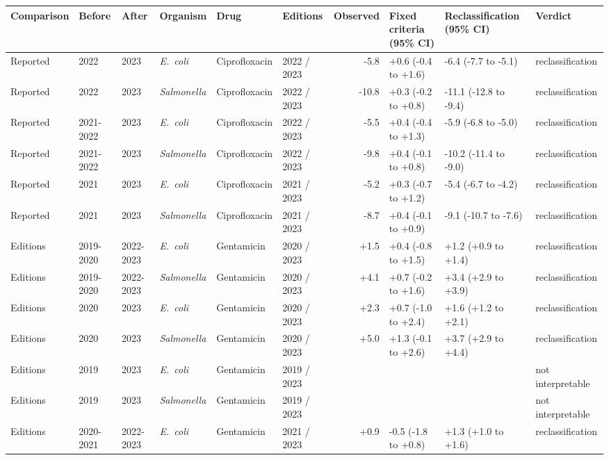 \begin{table}[h]
\centering
\scriptsize
\begin{tabular}{llllllrlll}
\toprule
Comparison & Before & After & Organism & Drug & Editions & Observed & Fixed criteria (95\% CI) & Reclassification (95\% CI) & Verdict \\
\midrule
Reported & 2022 & 2023 & \textit{E.~coli} & Ciprofloxacin & 2022 / 2023 & -5.8 & +0.6 (-0.4 to +1.6) & -6.4 (-7.7 to -5.1) & reclassification \\
Reported & 2022 & 2023 & \textit{Salmonella} & Ciprofloxacin & 2022 / 2023 & -10.8 & +0.3 (-0.2 to +0.8) & -11.1 (-12.8 to -9.4) & reclassification \\
Reported & 2021-2022 & 2023 & \textit{E.~coli} & Ciprofloxacin & 2022 / 2023 & -5.5 & +0.4 (-0.4 to +1.3) & -5.9 (-6.8 to -5.0) & reclassification \\
Reported & 2021-2022 & 2023 & \textit{Salmonella} & Ciprofloxacin & 2022 / 2023 & -9.8 & +0.4 (-0.1 to +0.8) & -10.2 (-11.4 to -9.0) & reclassification \\
Reported & 2021 & 2023 & \textit{E.~coli} & Ciprofloxacin & 2021 / 2023 & -5.2 & +0.3 (-0.7 to +1.2) & -5.4 (-6.7 to -4.2) & reclassification \\
Reported & 2021 & 2023 & \textit{Salmonella} & Ciprofloxacin & 2021 / 2023 & -8.7 & +0.4 (-0.1 to +0.9) & -9.1 (-10.7 to -7.6) & reclassification \\
Editions & 2019-2020 & 2022-2023 & \textit{E.~coli} & Gentamicin & 2020 / 2023 & +1.5 & +0.4 (-0.8 to +1.5) & +1.2 (+0.9 to +1.4) & reclassification \\
Editions & 2019-2020 & 2022-2023 & \textit{Salmonella} & Gentamicin & 2020 / 2023 & +4.1 & +0.7 (-0.2 to +1.6) & +3.4 (+2.9 to +3.9) & reclassification \\
Editions & 2020 & 2023 & \textit{E.~coli} & Gentamicin & 2020 / 2023 & +2.3 & +0.7 (-1.0 to +2.4) & +1.6 (+1.2 to +2.1) & reclassification \\
Editions & 2020 & 2023 & \textit{Salmonella} & Gentamicin & 2020 / 2023 & +5.0 & +1.3 (-0.1 to +2.6) & +3.7 (+2.9 to +4.4) & reclassification \\
Editions & 2019 & 2023 & \textit{E.~coli} & Gentamicin & 2019 / 2023 &  &  &  & not interpretable \\
Editions & 2019 & 2023 & \textit{Salmonella} & Gentamicin & 2019 / 2023 &  &  &  & not interpretable \\
Editions & 2020-2021 & 2022-2023 & \textit{E.~coli} & Gentamicin & 2021 / 2023 & +0.9 & -0.5 (-1.8 to +0.8) & +1.3 (+1.0 to +1.6) & reclassification \\

\end{tabular}
\end{table}
